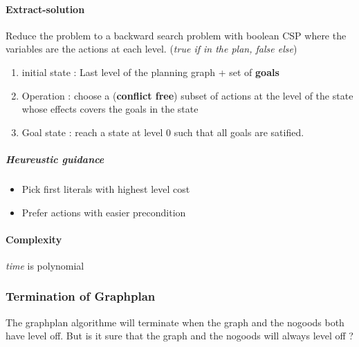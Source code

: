 \paragraph{Extract-solution}
Reduce the problem to a backward search problem with boolean CSP
where the variables are the actions at each level. (\textit{true if in the plan, false else})

\begin{enumerate}
    \item initial state : Last level of the planning graph + set of \textbf{goals} 
    \item Operation : choose a (\textbf{conflict free}) subset of actions at the level of
        the state whose effects covers the goals in the state
    \item Goal state : reach a state at level 0 such that all goals are satified.
\end{enumerate}

\subparagraph{Heureustic guidance}
\begin{itemize}
    \item Pick first literals with highest level cost
    \item Prefer actions with easier precondition
\end{itemize}

\paragraph{Complexity} \textit{time} is polynomial

\subsubsection{Termination of Graphplan}
The graphplan algorithme will terminate when the graph and the nogoods both have level off.
But is it sure that the graph and the nogoods will always level off ?

